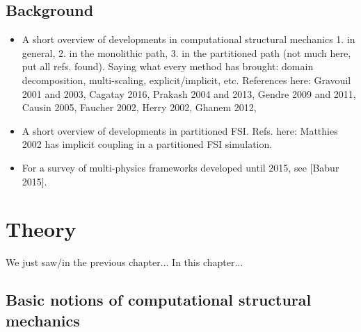\documentclass[a4paper, 11pt, oneside]{Thesis}  %
\begin{document}
    \section{Background}

        \begin{itemize}
            \item A short overview of developments in computational structural mechanics 1. in general, 2. in the monolithic path, 3. in the partitioned path (not much here, put all refs. found). Saying what every method has brought: domain decomposition, multi-scaling, explicit/implicit, etc. References here: Gravouil 2001 and 2003, Cagatay 2016, Prakash 2004 and 2013, Gendre 2009 and 2011, Causin 2005, Faucher 2002, Herry 2002, Ghanem 2012,%
            \item A short overview of developments in partitioned FSI. Refs. here: Matthies 2002 has implicit coupling in a partitioned FSI simulation.
            \item For a survey of multi-physics frameworks developed until 2015, see [Babur 2015].
        \end{itemize}


\chapter{Theory}

    We just saw/in the previous chapter...
    In this chapter...

    \section{Basic notions of computational structural mechanics}
    
\end{document}
